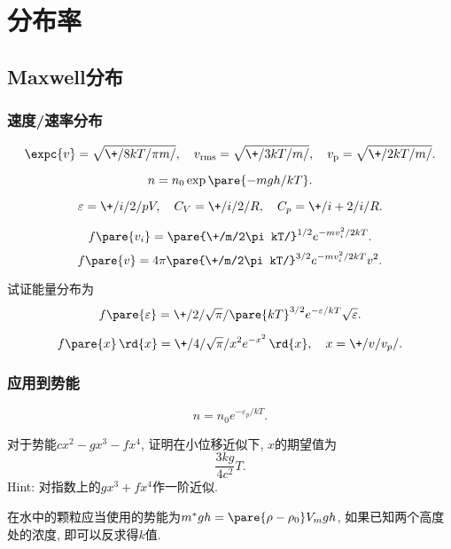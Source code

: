 \documentclass[hidelinks]{ctexart}
\begin{document}

\section{分布率} %
\label{sec:分布率}

\subsection{Maxwell分布} %
\label{sub:maxwell分布}

\subsubsection{速度/速率分布} %
\label{ssub:速度_速率分布}

\begin{finale}
    \[ \expc{v} = \sqrt{\+/8kT/\pi m/},\quad v_{\mathrm{rms}}=\sqrt{\+/3kT/m/},\quad v_{\mathrm{p}} = \sqrt{\+/2kT/m/}. \]
\end{finale}
\begin{finale}
    \[ n = n_0 \exp\pare{-mgh/kT}. \]
\end{finale}
\begin{finale}
    \[ \varepsilon = \+/i/2/ pV,\quad C_V = \+/i/2/ R,\quad C_p = \+/i+2/i/ R. \]
\end{finale}
\begin{finale}
    \[ f\pare{v_i} = \pare{\+/m/2\pi kT/}^{1/2} e^{-mv_i^2/2kT}. \]
    \[ f\pare{v} = 4\pi\pare{\+/m/2\pi kT/}^{3/2}e^{-mv_i^2/2kT}v^2. \]
\end{finale}
\begin{ex}
    试证能量分布为
    \[ f\pare{\varepsilon} = \+/2/\sqrt{\pi}/ \pare{kT}^{3/2}e^{-\varepsilon/kT}\sqrt{\varepsilon}. \]
\end{ex}
\begin{finale}
    \[ f\pare{x}\,\rd{x} = \+/4/\sqrt{\pi}/ x^2 e^{-x^2}\,\rd{x},\quad x = \+/v/v_p/. \]
\end{finale}


\subsubsection{应用到势能} %
\label{ssub:应用到势能}

\begin{finale}
    \begin{equation*}
        n = n_0 e^{-\varepsilon_p / kT}.
    \end{equation*}
\end{finale}
\begin{ex}
    对于势能$cx^2-gx^3-fx^4$, 证明在小位移近似下, $x$的期望值为
    \[ \frac{3kg}{4c^2}T. \]
    Hint: 对指数上的$gx^3+fx^4$作一阶近似.
\end{ex}
\begin{ex}
    在水中的颗粒应当使用的势能为$m^*gh = \pare{\rho - \rho_0}V_m gh$, 如果已知两个高度处的浓度, 即可以反求得$k$值.
\end{ex}
\end{document}
